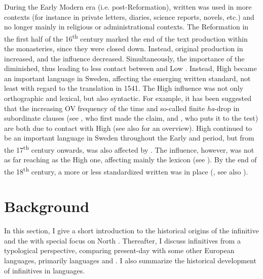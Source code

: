 \documentclass[output=paper]{langscibook}
\begin{document}
During the Early Modern era (i.e. post-Reformation), written  was used in more contexts (for instance in private letters, diaries, science reports, novels, etc.) and no longer mainly in religious or administrational contexts. The Reformation in the first half of the 16\textsuperscript{th} century marked the end of the text production within the monasteries, since they were closed down. Instead, original production in  increased, and the  influence decreased. Simultaneously, the importance of the  diminished, thus leading to less contact between  and Low . Instead, High  became an important language in Sweden, affecting the emerging written standard, not least with regard to the  translation in 1541. The High  influence was not only orthographic and lexical, but also syntactic. For example, it has been suggested that the increasing OV frequency of the time \citep{Petzell2011} and so-called finite \textit{ha}{}-drop in subordinate clauses (see \citealt{Johannisson1945}, who first made the claim, and \citealt{Backstrom2019}, who puts it to the test) are both due to contact with High  (see also \citealt{Braunmuller2005} for an overview). High  continued to be an important language in Sweden throughout the Early and  period, but from the 17\textsuperscript{th} century onwards,  was also affected by . The  influence, however, was not as far reaching as the High  one, affecting mainly the lexicon (see \citealt{Gellerstam2005}). By the end of the 18\textsuperscript{th} century, a more or less standardized written  was in place (\citealt{Teleman2002}, see also ).


\section{Background}\label{sec:kalm:3}


In this section, I give a short introduction to the historical origins of the infinitive and the  with special focus on North . Thereafter, I discuss  infinitives from a typological perspective, comparing present-day  with some other European languages, primarily  languages and . I also summarize the historical development of  infinitives in  languages. 
\end{document}
